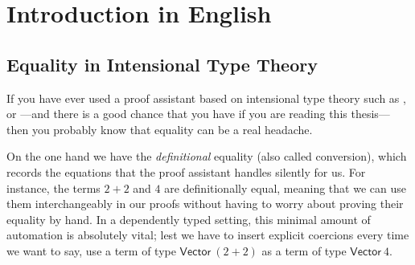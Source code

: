 \setchapterpreamble[u]{\margintoc}
\chapter{Introduction in English}



\section{Equality in Intensional Type Theory}

If you have ever used a proof assistant based on intensional type theory such as
\Coq, \Agda or {\Lean}---and there is a good chance that you have if you are 
reading this thesis---then you probably know that equality can be a real headache.

On the one hand we have the \emph{definitional} equality (also called conversion), which records the 
equations that the proof assistant handles silently for us.
% 
% 
For instance, the terms \( 2+2 \) and \( 4 \) are definitionally equal, meaning that we 
can use them interchangeably in our proofs without having to worry about 
proving their equality by hand.
% 
In a dependently typed setting, this minimal amount of automation is absolutely vital; 
lest we have to insert explicit coercions every time we want to say, use a term 
of type \( \mathsf{Vector}\ (2+2) \) as a term of type \( \mathsf{Vector}\ 4 \).

